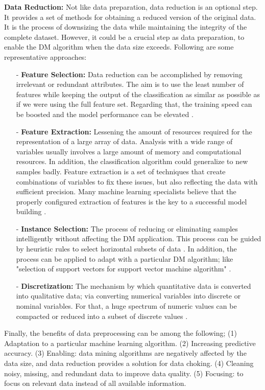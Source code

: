 \noindent \textbf{Data Reduction:}
Not like data preparation, data reduction is an optional step. It provides a set of methods for obtaining a reduced version of the original data. It is the process of downsizing the data while maintaining the integrity of the complete dataset. However, it could be a crucial step as data preparation, to enable the DM algorithm when the data size exceeds. Following are some representative approaches: 

\begin{itemize}
    \item[-] \textbf{Feature Selection:} Data reduction can be accomplished by removing irrelevant or redundant attributes. The aim is to use the least number of features while keeping the output of the classification as similar as possible as if we were using the full feature set. Regarding that, the training speed can be boosted and the model performance can be elevated \cite{li2017, dash1997}. 
    \item[-] \textbf{Feature Extraction:} Lessening the amount of resources required for the representation of a large array of data. Analysis with a wide range of variables usually involves a large amount of memory and computational resources. In addition,  the classification algorithm could generalize to new samples badly. Feature extraction is a set of techniques that create combinations of variables to fix these issues, but also reflecting the data with sufficient precision. Many machine learning specialists believe that the properly configured extraction of features is the key to a successful model building \cite{geron2019}. 
    
    \item[-] \textbf{Instance Selection:} The process of reducing or eliminating samples intelligently without affecting the DM application. This process can be guided by heuristic rules to select horizontal subsets of data \cite{olvera2010,fu2013}. In addition, the process can be applied to adapt with a particular DM algorithm; like "selection of support vectors for support vector machine algorithm" \cite{liu2017}.   
      \item[-] \textbf{Discretization:} The mechanism by which quantitative data is converted into qualitative data; via converting numerical variables into discrete or nominal variables. For that, a huge spectrum of numeric values can be compacted or reduced into a subset of discrete values \cite{ding2010}.  
\end{itemize}

Finally, the benefits of data preprocessing can be among the following; (1) Adaptation to a particular machine learning algorithm. (2) Increasing predictive accuracy. (3) Enabling: data mining algorithms are negatively affected by the data size, and data reduction provides a solution for data choking. (4) Cleaning noisy, missing, and redundant data to improve data quality. (5) Focusing: to focus on relevant data instead of all available information.

